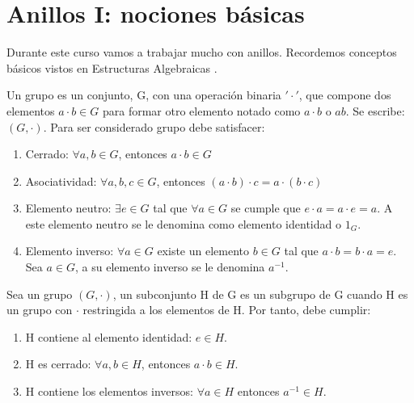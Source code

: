 \chapter{Anillos I: nociones básicas}

Durante este curso vamos a trabajar mucho con anillos. Recordemos conceptos básicos vistos en Estructuras Algebraicas \cite{apuntesEA}.


\begin{defn}[Grupo]
Un grupo es un conjunto, G, con una operación binaria $'\cdot'$, que compone dos elementos $a \cdot b \in G$ para formar otro elemento notado como $a \cdot b$ o $ab$. Se escribe: $(G,\cdot)$. Para ser considerado grupo debe satisfacer:
\begin{enumerate}
	\item Cerrado: $\forall a,b \in G$, entonces $a \cdot b \in G$
	\item Asociatividad: $\forall a,b,c \in G$, entonces $(a\cdot b) \cdot c = a \cdot (b \cdot c)$
	\item Elemento neutro: $\exists e \in G$ tal que $\forall a \in G$ se cumple que $e\cdot a=a\cdot e = a$. A este elemento neutro se le denomina como elemento identidad o $1_G$.
	\item Elemento inverso: $\forall a \in G$ existe un elemento $b \in G$ tal que $a \cdot b = b \cdot a = e$. Sea $a \in G$, a su elemento inverso se le denomina $a^{-1}$.
\end{enumerate}
\end{defn}

\begin{defn}[Subgrupo]
Sea un grupo  $(G,\cdot)$, un subconjunto H de G es un subgrupo de G cuando H es un grupo con $\cdot$ restringida a los elementos de H. Por tanto, debe cumplir:
\begin{enumerate}
	\item H contiene al elemento identidad: $e \in H$.
	\item H es cerrado: $\forall a,b \in H$, entonces $a \cdot b \in H$.
	\item H contiene los elementos inversos: $\forall a \in H$ entonces $a^{-1} \in H$.
\end{enumerate}
\end{defn}

